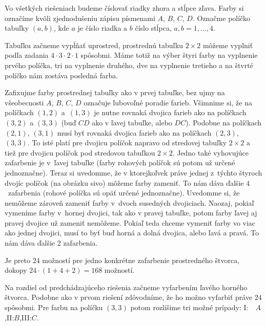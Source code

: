 {%
Vo všetkých riešeniach budeme číslovať riadky zhora a stĺpce zľava.
Farby si označíme kvôli zjednodušeniu zápisu písmenami $A$, $B$, $C$, $D$. Označme políčko tabuľky $(a,b)$, kde $a$ je číslo riadka a $b$ číslo stĺpca, $a,b=1,\ldots,4$.

Tabuľku začneme vypĺňať uprostred, prostrednú tabuľku $2\times 2$ môžeme vyplniť podľa zadania $4 \cdot 3 \cdot 2 \cdot 1$ spôsobmi. Máme totiž na výber štyri farby na vyplnenie prvého políčka, tri na vyplnenie druhého, dve na vyplnenie tretieho a na štvrté políčko nám zostáva posledná farba.

Zafixujme farby prostrednej tabuľky ako v prvej tabuľke, bez ujmy na všeobecnosti $A$, $B$, $C$, $D$ označuje ľubovoľné poradie farieb. Všimnime si, že na políčkach $(1,2)$ a~$(1,3)$ je nutne rovnaká dvojica farieb ako na políčkach $(3,2)$ a $(3,3)$ (buď $CD$ ako v ľavej tabuľke, alebo $DC$). Podobne na políčkach $(2,1)$, $(3,1)$ musí byť rovnaká dvojica farieb ako na políčkach $(2,3)$, $(3,3)$. To isté platí pre dvojicu políčok napravo od stredovej tabuľky $2\times 2$ a tiež pre dvojicu políčok pod stredovou tabuľkou $2\times 2$. Jedno také vyhovujúce zafarbenie je v~ľavej tabuľke (farby rohových políčok sú potom už určené jednoznačne).
Teraz si uvedomme, že v ktorejkoľvek práve jednej z~týchto štyroch dvojíc políčok (na obrázku sivo) môžeme farby zameniť. To nám dáva ďalšie $4$~zafarbenia (rohové políčka sú opäť určené jednoznačne). Uvedomme si, že nemôžeme zároveň zameniť farby v~dvoch susedných dvojiciach. Naozaj, pokiaľ vymeníme farby v~hornej dvojici, tak ako v pravej tabuľke, potom farby ľavej aj pravej dvojice už zameniť nemôžeme.
Pokiaľ teda chceme vymeniť farby vo viac ako jednej dvojici, musí to byť buď horná a dolná dvojica, alebo ľavá a pravá. To nám dáva ďalšie 2 zafarbenia.
\midinsert
\centerline{
 \hfil
 \hfil
}
\endinsert

Je preto $24$ možností pre jedno konkrétne zafarbenie prostredného štvorca, dokopy
$24 \cdot (1 + 4 +2) = 168 $ možností.

\ineriesenie
Na rozdiel od predchádzajúceho riešenia začneme vyfarbením ľavého horného štvorca.
Podobne ako v prvom riešení zdôvodníme, že ho možno vyfarbiť práve $24$ spôsobmi.
Pre farbu na políčku $(3,3)$ potom rozlíšime tri možné prípady:\quad
I:$\quad A$,\quad II:\quad $B$,\quad III:\quad $C$.
\midinsert
\centerline{
\hfil
\hfil
}
\endinsert


}
